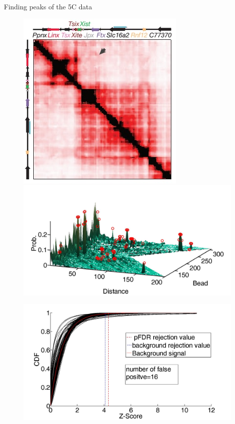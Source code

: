 \documentclass[8pt]{beamer}
\begin{document}
\begin{frame}{Finding peaks of the 5C data}

\begin{figure}[H]
\includegraphics[scale=0.3]{tadDandENoraEtAl2012}
\includegraphics[scale=0.15]{tadESurfaceWithPeaks}
\end{figure}
\begin{figure}[H]
\includegraphics[scale=0.07]{tadEZScoreDistributionWithThresh}
\end{figure}
\end{frame}
\end{document}
